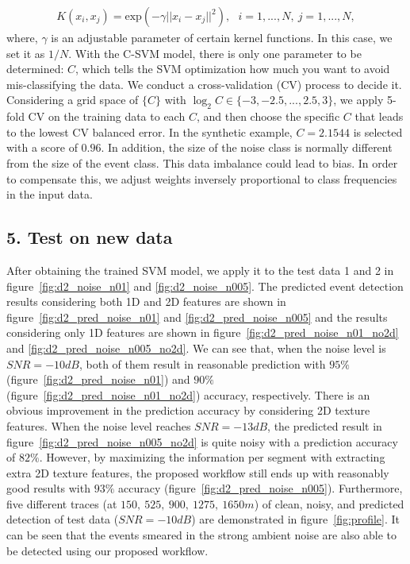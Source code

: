 \begin{equation}
\begin{split}
      K\left( x_i, x_j\right) = \text{exp}\left( -\gamma || x_i-x_j||^2 \right),~~~ i=1, ..., N,~ j=1, ..., N,
\label{eq3}
\end{split}
\end{equation}
where, $\gamma$ is an adjustable parameter of certain kernel functions. In this case, we set it as $1/{N}$. With the C-SVM model, there is only one parameter to be determined: $C$, which tells the SVM optimization how much you want to avoid mis-classifying the data. We conduct a cross-validation (CV) process to decide it. Considering a grid space of $\{C\}$ with $\log_2 C \in \{-3, -2.5, ..., 2.5, 3 \}$, we apply 5-fold CV on the training data to each $C$, and then choose the specific $C$ that leads to the lowest CV balanced error. In the synthetic example, $C=2.1544$ is selected with a score of $0.96$. In addition, the size of the noise class is normally different from the size of the event class. This data imbalance could lead to bias. In order to compensate this, we adjust weights inversely proportional to class frequencies in the input data.

\subsection{5. Test on new data}
After obtaining the trained SVM model, we apply it to the test data 1 and 2 in figure~\ref{fig:d2_noise_n01} and \ref{fig:d2_noise_n005}. The predicted event detection results considering both 1D and 2D features are shown in figure~\ref{fig:d2_pred_noise_n01} and \ref{fig:d2_pred_noise_n005} and the results considering only 1D features are shown in figure~\ref{fig:d2_pred_noise_n01_no2d} and \ref{fig:d2_pred_noise_n005_no2d}. We can see that, when the noise level is $SNR=-10dB$, both of them result in reasonable prediction with $95\%$ (figure~\ref{fig:d2_pred_noise_n01}) and $90\%$ (figure~\ref{fig:d2_pred_noise_n01_no2d}) accuracy, respectively. There is an obvious improvement in the prediction accuracy by considering 2D texture features. When the noise level reaches $SNR=-13dB$, the predicted result in figure~\ref{fig:d2_pred_noise_n005_no2d} is quite noisy with a prediction accuracy of $82\%$. However, by maximizing the information per segment with extracting extra 2D texture features, the proposed workflow still ends up with reasonably good results with $93\%$ accuracy (figure~\ref{fig:d2_pred_noise_n005}).
Furthermore, five different traces (at $150,~525,~900,~1275,~1650m$) of clean, noisy, and predicted detection of test data ($SNR=-10dB$) are demonstrated in figure~\ref{fig:profile}. It can be seen that the events smeared in the strong ambient noise are also able to be detected using our proposed workflow.

